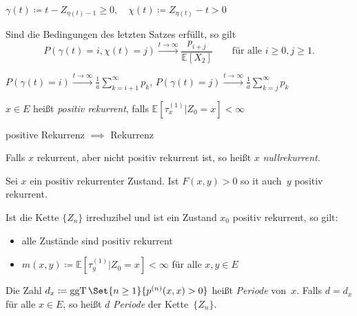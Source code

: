 \documentclass{cheat-sheet}
\newcommand{\E}{\mathbb{E}} %
\DeclareMathOperator{\ggT}{ggT} %
\begin{document}
\begin{defn}
  $
    \gamma(t) \coloneqq t - Z_{\eta(t)-1} \geq 0, \quad
    \chi(t) \coloneqq Z_{\eta(t)} - t > 0
  $
\end{defn}

\begin{satz}
  Sind die Bedingungen des letzten Satzes erfüllt, so gilt
  \[
    P(\gamma(t)=i, \chi(t)=j) \xrightarrow{t \to \infty} \frac{p_{i+j}}{\E[X_2]}
    \qquad \text{für alle } i \geq 0, j \geq 1.
  \]
\end{satz}

\begin{kor}
  $P(\gamma(t) = i) \xrightarrow{t \to \infty} \frac{1}{a} \sum_{k=i+1}^\infty p_k$,
  $P(\gamma(t) = j) \xrightarrow{t \to \infty} \frac{1}{a} \sum_{k=j}^\infty p_k$
\end{kor}



\begin{defn}
  $x \in E$ heißt \emph{positiv rekurrent}, falls $\E [\tau_x^{(1)} | Z_0=x] < \infty$
\end{defn}

\begin{bem}
  positive Rekurrenz $\implies$ Rekurrenz
\end{bem}

\begin{defn}
  Falls $x$ rekurrent, aber nicht positiv rekurrent ist, so heißt $x$ \emph{nullrekurrent}.
\end{defn}

\begin{lem}
  Sei $x$ ein positiv rekurrenter Zustand.
  Ist $F(x, y) > 0$ so it auch~$y$ positiv rekurrent.
\end{lem}

\begin{kor}
  Ist die Kette $\{ Z_n \}$ irreduzibel und ist ein Zustand $x_0$ positiv rekurrent, so gilt:
  \begin{itemize}
    \item alle Zustände sind positiv rekurrent
    \item $m(x, y) \coloneqq \E[ \tau^{(1)}_y | Z_0 = x ] < \infty$ für alle $x, y \in E$
  \end{itemize}
\end{kor}

\begin{defn}
  Die Zahl
  $d_x \coloneqq \ggT \Set{n \geq 1}{p^{(n)}(x,x) > 0}$
  heißt \emph{Periode} von~$x$.
  Falls $d = d_x$ für alle $x \in E$, so heißt $d$ \textit{Periode} der Kette~$\{ Z_n \}$.
\end{defn}
\end{document}
